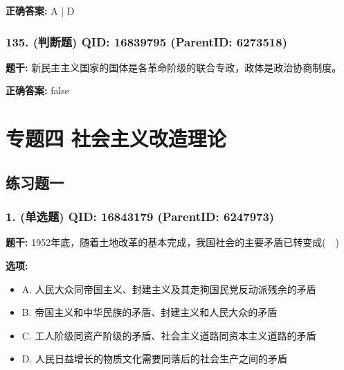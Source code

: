 \documentclass[12pt,UTF8]{ctexart}
\begin{document}
\textbf{正确答案:}
A | D

\vspace{0.3em}\hrulefill\vspace{0.7em}

\subsubsection*{135. (判断题) \small QID: 16839795 (ParentID: 6273518)}

\textbf{题干:}
新民主主义国家的国体是各革命阶级的联合专政，政体是政治协商制度。



\textbf{正确答案:}
false

\vspace{0.3em}\hrulefill\vspace{0.7em}

\section*{专题四 社会主义改造理论}
\hrulefill

\subsection*{练习题一}

\subsubsection*{1. (单选题) \small QID: 16843179 (ParentID: 6247973)}

\textbf{题干:}
1952年底，随着土地改革的基本完成，我国社会的主要矛盾已转变成(  )



\textbf{选项:}
\begin{itemize}[leftmargin=*]

  \item A. 人民大众同帝国主义、封建主义及其走狗国民党反动派残余的矛盾

  \item B. 帝国主义和中华民族的矛盾、封建主义和人民大众的矛盾

  \item C. 工人阶级同资产阶级的矛盾、社会主义道路同资本主义道路的矛盾

  \item D. 人民日益增长的物质文化需要同落后的社会生产之间的矛盾

\end{itemize}
\end{document}
